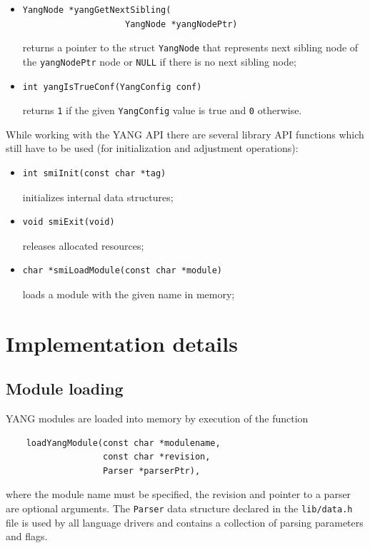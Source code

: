 \documentclass[conference]{IEEEtran}
\begin{document}
\begin{itemize}
\item 
\small
\begin{verbatim}
YangNode *yangGetNextSibling(
                    YangNode *yangNodePtr)
\end{verbatim}
\normalsize
returns a pointer to the struct \texttt{YangNode} that represents next sibling node of the \texttt{yangNodePtr} node or \texttt{NULL} if there is no next sibling node;

\item 
\small
\begin{verbatim}
int yangIsTrueConf(YangConfig conf)
\end{verbatim}
\normalsize
returns \texttt{1} if the given \texttt{YangConfig} value is true and \texttt{0} otherwise.
\end{itemize}

While working with the YANG API there are several library API functions which still have to be used (for initialization and adjustment operations):
\begin{itemize}
\item 
\small
\begin{verbatim}
int smiInit(const char *tag)
\end{verbatim}
\normalsize
initializes internal data structures;

\item 
\small
\begin{verbatim}
void smiExit(void)
\end{verbatim}
\normalsize
releases allocated resources;

\item 
\small
\begin{verbatim}
char *smiLoadModule(const char *module)
\end{verbatim}
\normalsize
loads a module with the given name in memory;
\end{itemize}

\section{Implementation details}
\subsection{Module loading}
YANG modules are loaded into memory by execution of the function 
\small
\begin{verbatim}
    loadYangModule(const char *modulename, 
                   const char *revision, 
                   Parser *parserPtr),
\end{verbatim}
\normalsize
where the module name must be specified, the revision and pointer to a parser are optional arguments. The \texttt{Parser} data structure declared in the \texttt{lib/data.h} file is used by all language drivers and contains a collection of parsing parameters and flags.
\end{document}
